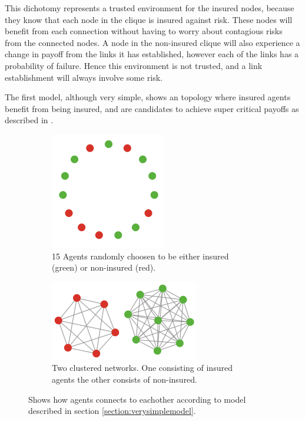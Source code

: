 This dichotomy represents a trusted environment for the insured nodes, because they know that each node in the clique is insured against risk. These nodes will benefit from each connection without having to worry about contagious risks from the connected nodes. 
A node in the non-insured clique will also experience a change in payoff from the links it has established, however each of the links has a probability of failure. Hence this environment is not trusted, and a link establishment will always involve some risk. 

The first model, although very simple, shows an topology where insured agents benefit from being insured, and are candidates to achieve super critical payoffs as described in \cite{contagion}.

\begin{figure}[h]
\centering
\begin{subfigure}{.5\textwidth}
  \centering
  \includegraphics[width=0.4\linewidth]{../Figures/firstModelWithNoParameters1.png}
  \caption{\label{fig:firstmod1} 15 Agents randomly choosen to be either insured (green) or non-insured (red).}
\end{subfigure}
\quad
\begin{subfigure}{.46\textwidth}
  \centering
  \includegraphics[width=0.8\linewidth]{../Figures/firstModelWithNoParameters2.png}
  \caption{\label{fig:firstmod2} Two clustered networks. One consisting of insured agents the other consists of non-insured.}
\end{subfigure}
\caption{\label{fig:firstmodfinal} Shows how agents connects to eachother according to model described in section \ref{section:verysimplemodel}.}
\end{figure}
 
